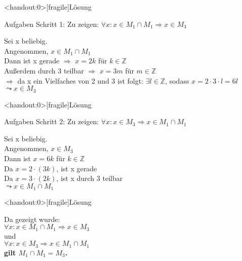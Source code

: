 {
\begin{frame}<handout:0>[fragile]{Lösung}
    \begin{alertblock}{Aufgaben}
        Schritt 1: Zu zeigen: $\forall x: x \in M_1 \cap M_1 \Rightarrow x \in M_3$
    \end{alertblock}

    Sei x beliebig.\\
    Angenommen, $x \in M_1 \cap M_1$\\
    Dann ist x gerade $\Rightarrow$ $x= 2k$ für $k \in \mathbb{Z}$\\
    Außerdem durch 3 teilbar $\Rightarrow$ $x= 3m$ für $m \in \mathbb{Z}$\\
    $\Rightarrow$ da x ein Vielfaches von 2 und 3 ist folgt: $\exists l \in \mathbb{Z}$, sodass $x=2\cdot 3 \cdot l = 6l$\\
    $\leadsto x \in M_3$



\end{frame}
}
{
\begin{frame}<handout:0>[fragile]{Lösung}
    \begin{alertblock}{Aufgaben}
        Schritt 2: Zu zeigen: $\forall x: x \in M_3 \Rightarrow x \in M_1 \cap M_1$\\
    \end{alertblock}

    Sei x beliebig.\\
    Angenommen, $x \in M_3$\\
    Dann ist $x = 6k$ für $k \in \mathbb{Z}$\\
    Da $x = 2 \cdot (3k)$, ist x gerade\\
    Da $x= 3 \cdot (2k)$, ist x durch 3 teilbar\\
    $\leadsto x \in M_1 \cap M_1$



\end{frame}
}

{
\begin{frame}<handout:0>[fragile]{Lösung}


    Da gezeigt wurde:\\
    \vspace{0.3cm}
    $\forall x: x \in M_1 \cap M_1 \Rightarrow x \in M_3$\\
    \alert{und}\\
    $\forall x: x \in M_3 \Rightarrow x \in M_1 \cap M_1$\\
    \vspace{0.3cm}
    \textbf{gilt $M_1 \cap M_1 = M_3$.}


\end{frame}
}

